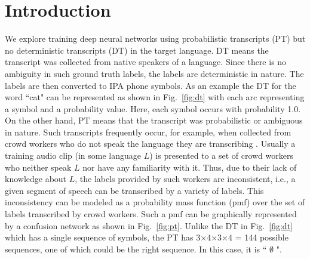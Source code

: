 \documentclass[a4paper]{article}
\begin{document}
\section{Introduction}  \vspace{-2mm}
\label{sec:Introduction}
We explore training deep neural networks using probabilistic transcripts (PT) but no deterministic transcripts (DT) in the target language. DT means the transcript was collected from native speakers of a language. Since there is no ambiguity in such ground truth labels, the labels are deterministic in nature. The labels are then converted to IPA phone symbols. As an example the DT for the word ``cat" can be represented as shown in Fig.~\ref{fig:dt} with each arc representing a symbol and a probability value. Here, each symbol occurs with probability 1.0. On the other hand, PT means that the transcript was probabilistic or ambiguous in nature. Such transcripts frequently occur, for example, when collected from crowd workers who do not speak the language they are transcribing \cite{Jyothi-MismatchedCrowdsourcingTrans}. Usually a training audio clip (in some language $L$) is presented to a set of crowd workers who neither speak $L$ nor have any familiarity with it. Thus, due to their lack of knowledge about $L$, the labels provided by such workers are inconsistent, i.e., a given segment of speech can be transcribed by a variety of labels. This inconsistency can be modeled as a probability mass function (pmf) over the set of labels transcribed by crowd workers. Such a pmf can be graphically represented by a confusion network as shown in Fig.~\ref{fig:pt}. Unlike the DT in Fig.~\ref{fig:dt} which has a single sequence of symbols, the PT has 3$\times$4$\times$3$\times$4 = 144 possible sequences, one of which could be the right sequence. In this case, it is `` \ipa{\ae} $\emptyset$ ".

\end{document}
